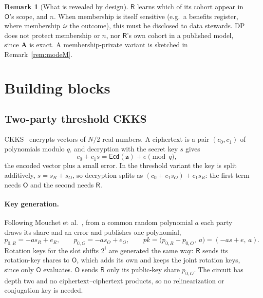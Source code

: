 \documentclass[11pt]{article}
\theoremstyle{definition}
\newtheorem{remark}{Remark}[section]
\theoremstyle{plain}
\newcommand{\Ecd}{\mathsf{Ecd}}
\newcommand{\bA}{\mathbf{A}}
\newcommand{\Party}[1]{\textsf{#1}}
\newcommand{\Rp}{\Party{R}}
\newcommand{\Op}{\Party{O}}
\newcommand{\pk}{\mathit{pk}}
\begin{document}
\begin{remark}[What is revealed by design]
\label{rem:revealed}
$\Rp$ learns which of its cohort appear in $\Op$'s scope, and $n$. When membership is itself sensitive (e.g.\ a benefits register, where membership \emph{is} the outcome), this must be disclosed to data stewards. DP does not protect membership or $n$, nor $\Rp$'s own cohort in a published model, since $\bA$ is exact. A membership-private variant is sketched in Remark~\ref{rem:modeM}.
\end{remark}

\section{Building blocks}
\label{sec:blocks}

\subsection{Two-party threshold CKKS}
\label{sec:blocks:he}

CKKS~\cite{cheon2017homomorphic} encrypts vectors of $N/2$ real numbers. A ciphertext is a pair $(c_0, c_1)$ of polynomials modulo $q$, and decryption with the secret key $s$ gives
\[
  c_0 + c_1 s = \Ecd(\mathbf z) + e \pmod q,
\]
the encoded vector plus a small error. In the threshold variant the key is split additively, $s = s_R + s_O$, so decryption splits as $(c_0 + c_1 s_O) + c_1 s_R$: the first term needs $\Op$ and the second needs $\Rp$.

\paragraph{Key generation.} Following Mouchet et al.~\cite{mouchet2021multiparty}, from a common random polynomial $a$ each party draws its share and an error and publishes one polynomial,
\[
  p_{0,R} = -a s_R + e_R, \qquad p_{0,O} = -a s_O + e_O, \qquad \pk = \bigl(p_{0,R} + p_{0,O},\ a\bigr) = (-a s + e,\ a).
\]
Rotation keys for the slot shifts $2^i$ are generated the same way: $\Rp$ sends its rotation-key shares to $\Op$, which adds its own and keeps the joint rotation keys, since only $\Op$ evaluates. $\Op$ sends $\Rp$ only its public-key share $p_{0,O}$. The circuit has depth two and no ciphertext--ciphertext products, so no relinearization or conjugation key is needed.
\end{document}
